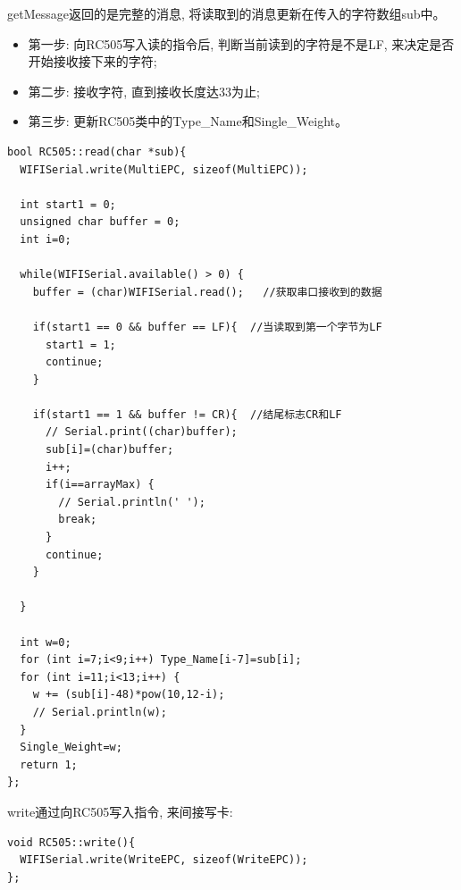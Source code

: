 \documentclass{article}
\begin{document}
getMessage返回的是完整的消息, 将读取到的消息更新在传入的字符数组sub中。
\begin{itemize}
  \item 第一步: 向RC505写入读的指令后, 判断当前读到的字符是不是LF, 来决定是否开始接收接下来的字符;
  \item 第二步: 接收字符, 直到接收长度达33为止;
  \item 第三步: 更新RC505类中的Type\_Name和Single\_Weight。
\end{itemize}

\begin{lstlisting}
bool RC505::read(char *sub){
  WIFISerial.write(MultiEPC, sizeof(MultiEPC));
  
  int start1 = 0;
  unsigned char buffer = 0;
  int i=0;
  
  while(WIFISerial.available() > 0) { 
    buffer = (char)WIFISerial.read();   //获取串口接收到的数据

    if(start1 == 0 && buffer == LF){  //当读取到第一个字节为LF
      start1 = 1;
      continue;
    }

    if(start1 == 1 && buffer != CR){  //结尾标志CR和LF
      // Serial.print((char)buffer);
      sub[i]=(char)buffer; 
      i++;
      if(i==arrayMax) {
        // Serial.println(' ');
        break;
      }   
      continue;
    }

  }

  int w=0;
  for (int i=7;i<9;i++) Type_Name[i-7]=sub[i];
  for (int i=11;i<13;i++) {
    w += (sub[i]-48)*pow(10,12-i);
    // Serial.println(w);
  }
  Single_Weight=w;
  return 1;
};
\end{lstlisting}

write通过向RC505写入指令, 来间接写卡:
\begin{lstlisting}
void RC505::write(){
  WIFISerial.write(WriteEPC, sizeof(WriteEPC));
};
\end{lstlisting}
\end{document}
